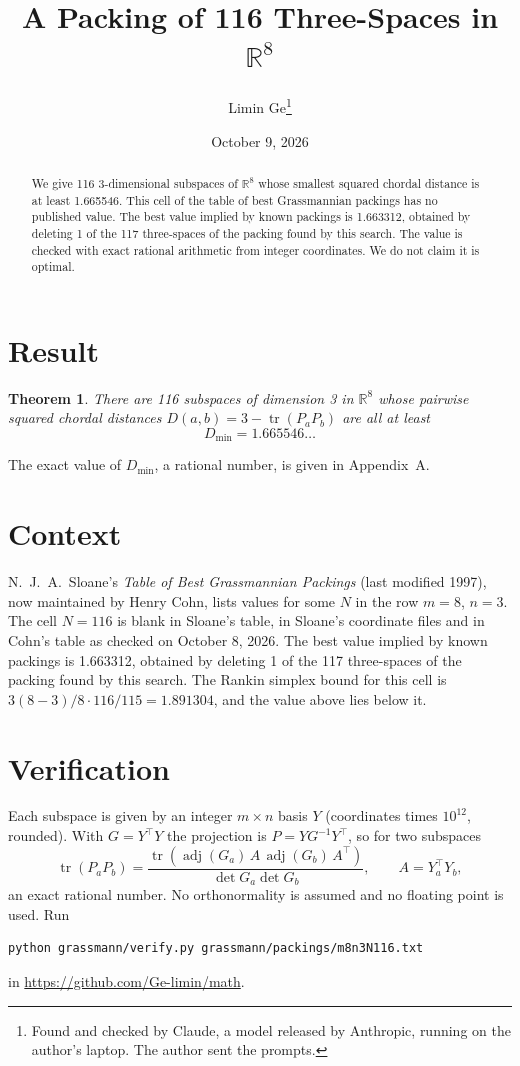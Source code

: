 \documentclass[11pt,a4paper]{article}
\title{A Packing of 116 Three-Spaces in $\mathbb{R}^{8}$}
\author{Limin Ge\thanks{Found and checked by Claude, a model released by Anthropic, running on the author's laptop. The author sent the prompts.}}
\date{October 9, 2026}
\newtheorem*{theorem}{Theorem}
\begin{document}
\maketitle
\begin{abstract}
We give 116 3-dimensional subspaces of $\mathbb{R}^{8}$ whose smallest squared chordal distance is at least 1.665546. This cell of the table of best Grassmannian packings has no published value. The best value implied by known packings is 1.663312, obtained by deleting 1 of the 117 three-spaces of the packing found by this search. The value is checked with exact rational arithmetic from integer coordinates. We do not claim it is optimal.
\end{abstract}

\section{Result}
\begin{theorem}
There are 116 subspaces of dimension 3 in $\mathbb{R}^{8}$ whose pairwise squared chordal distances $D(a,b) = 3 - \operatorname{tr}(P_aP_b)$ are all at least
\[ D_{\min} = 1.665546\ldots \]
\end{theorem}
The exact value of $D_{\min}$, a rational number, is given in Appendix~A.


\section{Context}
N.~J.~A.~Sloane's \emph{Table of Best Grassmannian Packings} (last modified 1997), now maintained by Henry Cohn, lists values for some $N$ in the row $m=8$, $n=3$. The cell $N=116$ is blank in Sloane's table, in Sloane's coordinate files and in Cohn's table as checked on October 8, 2026. The best value implied by known packings is 1.663312, obtained by deleting 1 of the 117 three-spaces of the packing found by this search. The Rankin simplex bound for this cell is $3(8-3)/8\cdot 116/115 = 1.891304$, and the value above lies below it.


\section{Verification}
Each subspace is given by an integer $m\times n$ basis $Y$ (coordinates times $10^{12}$, rounded). With $G=Y^\top Y$ the projection is $P=YG^{-1}Y^\top$, so for two subspaces
\[ \operatorname{tr}(P_aP_b)=\frac{\operatorname{tr}(\operatorname{adj}(G_a)\,A\,\operatorname{adj}(G_b)\,A^\top)}{\det G_a\det G_b},\qquad A=Y_a^\top Y_b, \]
an exact rational number. No orthonormality is assumed and no floating point is used. Run
\begin{verbatim}
python grassmann/verify.py grassmann/packings/m8n3N116.txt
\end{verbatim}
in \url{https://github.com/Ge-limin/math}.
\end{document}
